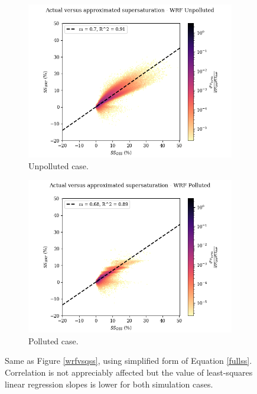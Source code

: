 \documentclass{article}
\begin{document}
\begin{figure}[ht]
	\centering
	\begin{subfigure}{0.7\textwidth}
		\includegraphics[width=\textwidth]{revmywrf/v11_FINAL_heatmap_ss_qss_vs_ss_wrf_Unpolluted_figure.png}
		\caption{Unpolluted case.}
		\label{wrfvsqssunpollv11}
	\end{subfigure}
	\begin{subfigure}{0.7\textwidth}
		\includegraphics[width=\textwidth]{revmywrf/v11_FINAL_heatmap_ss_qss_vs_ss_wrf_Polluted_figure.png}
		\caption{Polluted case.}
		\label{wrfvsqsspollv11}
	\end{subfigure}
	\caption{Same as Figure \ref{wrfvsqss}, using simplified form of Equation \ref{fullss}. Correlation is not appreciably affected but the value of least-squares linear regression slopes is lower for both simulation cases.}
	\label{wrfvsqssv11}
\end{figure}
\end{document}
